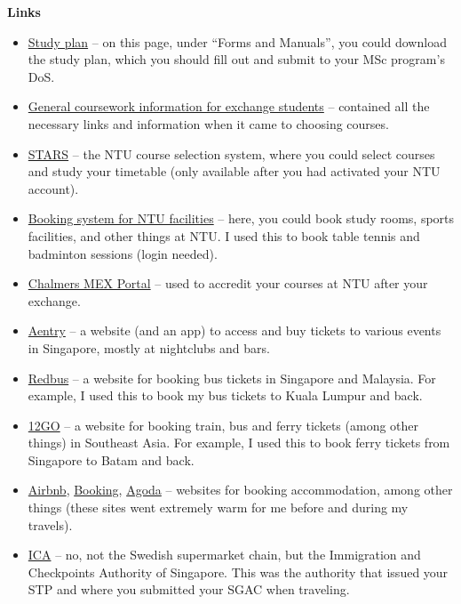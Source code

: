 \textbf{Links}
\begin{itemize}
    \item \href{https://www.chalmers.se/en/education/your-studies/exchange-studies-and-international-opportunities/exchange-studies/preparing-for-exchange-studies/}{Study plan} -- on this page, under ``Forms and Manuals'', you could download the study plan, which you should fill out and submit to your MSc program's DoS.
    \item \href{https://gem.ntu.edu.sg/index.cfm?FuseAction=Programs.ViewProgramAngular&id=10006}{General coursework information for exchange students} -- contained all the necessary links and information when it came to choosing courses.
    \item \href{https://wish.wis.ntu.edu.sg/pls/webexe/ldap_login.login?w_url=https://wish.wis.ntu.edu.sg/pls/webexe/aus_stars_planner.main}{STARS} -- the NTU course selection system, where you could select courses and study your timetable (only available after you had activated your NTU account).
    \item \href{https://www.google.com/url?sa=t&source=web&rct=j&opi=89978449&url=https://ntu.facilitiesbooking.com/&ved=2ahUKEwi-k6Pays2LAxUg2TgGHZjtK4sQFnoECAsQAQ&usg=AOvVaw0UI5Z1OVQuEv2rAMKN2LGh}{Booking system for NTU facilities} -- here, you could book study rooms, sports facilities, and other things at NTU. I used this to book table tennis and badminton sessions (login needed).
    \item \href{https://mex.portal.chalmers.se}{Chalmers MEX Portal} -- used to accredit your courses at NTU after your exchange.
    \item \href{https://aentry.app/events}{Aentry} -- a website (and an app) to access and buy tickets to various events in Singapore, mostly at nightclubs and bars.
    \item \href{https://www.redbus.sg}{Redbus} -- a website for booking bus tickets in Singapore and Malaysia. For example, I used this to book my bus tickets to Kuala Lumpur and back.
    \item \href{https://12go.asia/en}{12GO} -- a website for booking train, bus and ferry tickets (among other things) in Southeast Asia. For example, I used this to book ferry tickets from Singapore to Batam and back.
    \item \href{https://www.airbnb.se}{Airbnb}, \href{https://www.booking.com}{Booking}, \href{https://www.agoda.com/sv-se/?ds=eGn8Sjtq6XiLUdOw}{Agoda} -- websites for booking accommodation, among other things (these sites went extremely warm for me before and during my travels).
    \item \href{https://www.ica.gov.sg}{ICA} -- no, not the Swedish supermarket chain, but the Immigration and Checkpoints Authority of Singapore. This was the authority that issued your STP and where you submitted your SGAC when traveling.
\end{itemize}
